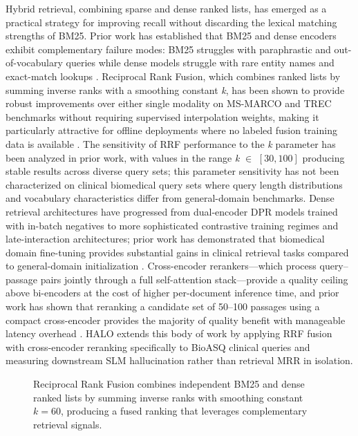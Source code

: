 \documentclass{article}
\begin{document}
Hybrid retrieval, combining sparse and dense ranked lists, has emerged as a practical strategy for improving recall without discarding the lexical matching strengths of BM25. Prior work has established that BM25 and dense encoders exhibit complementary failure modes: BM25 struggles with paraphrastic and out-of-vocabulary queries while dense models struggle with rare entity names and exact-match lookups \cite{thakur2021beir}. Reciprocal Rank Fusion, which combines ranked lists by summing inverse ranks with a smoothing constant \textit{k}, has been shown to provide robust improvements over either single modality on MS-MARCO and TREC benchmarks without requiring supervised interpolation weights, making it particularly attractive for offline deployments where no labeled fusion training data is available \cite{cormack2009reciprocal}. The sensitivity of RRF performance to the \textit{k} parameter has been analyzed in prior work, with values in the range \textit{k} $\in$ $[30, 100]$ producing stable results across diverse query sets; this parameter sensitivity has not been characterized on clinical biomedical query sets where query length distributions and vocabulary characteristics differ from general-domain benchmarks. Dense retrieval architectures have progressed from dual-encoder DPR models trained with in-batch negatives \cite{karpukhin2020dense} to more sophisticated contrastive training regimes and late-interaction architectures; prior work has demonstrated that biomedical domain fine-tuning provides substantial gains in clinical retrieval tasks compared to general-domain initialization \cite{xiong2021approximate}. Cross-encoder rerankers---which process query--passage pairs jointly through a full self-attention stack---provide a quality ceiling above bi-encoders at the cost of higher per-document inference time, and prior work has shown that reranking a candidate set of 50--100 passages using a compact cross-encoder provides the majority of quality benefit with manageable latency overhead \cite{nogueira2019passage}. HALO extends this body of work by applying RRF fusion with cross-encoder reranking specifically to BioASQ clinical queries and measuring downstream SLM hallucination rather than retrieval MRR in isolation.

\begin{figure}[t]
\centering

\caption{Reciprocal Rank Fusion combines independent BM25 and dense ranked lists by summing inverse ranks with smoothing constant $k=60$, producing a fused ranking that leverages complementary retrieval signals.}
\label{fig:rrf_fusion}
\end{figure}
\end{document}
